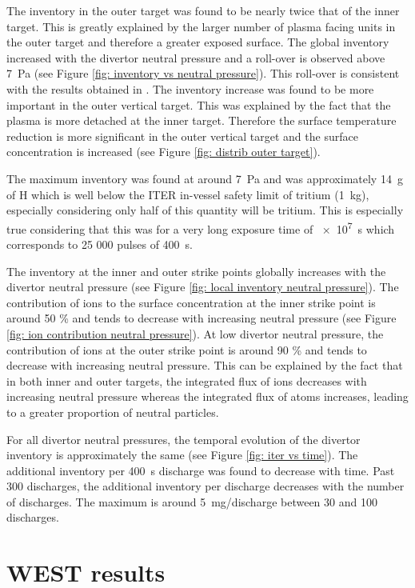 The inventory in the outer target was found to be nearly twice that of the inner target.
This is greatly explained by the larger number of plasma facing units in the outer target and therefore a greater exposed surface.
The global inventory increased with the divertor neutral pressure and a roll-over is observed above \SI{7}{Pa} (see Figure \ref{fig: inventory vs neutral pressure}).
This roll-over is consistent with the results obtained in .
The inventory increase was found to be more important in the outer vertical target.
This was explained by the fact that the plasma is more detached at the inner target.
Therefore the surface temperature reduction is more significant in the outer vertical target and the surface concentration is increased (see Figure \ref{fig: distrib outer target}).

The maximum inventory was found at around \SI{7}{Pa} and was approximately \SI{14}{g} of H which is well below the ITER in-vessel safety limit of tritium (\SI{1}{kg}), especially considering only half of this quantity will be tritium.
This is especially true considering that this was for a very long exposure time of \SI{e7}{s} which corresponds to 25 000 pulses of \SI{400}{s}.


The inventory at the inner and outer strike points globally increases with the divertor neutral pressure (see Figure \ref{fig: local inventory neutral pressure}).
The contribution of ions to the surface concentration at the inner strike point is around 50 \% and tends to decrease with increasing neutral pressure (see Figure \ref{fig: ion contribution neutral pressure}).
At low divertor neutral pressure, the contribution of ions at the outer strike point is around 90 \% and tends to decrease with increasing neutral pressure.
This can be explained by the fact that in both inner and outer targets, the integrated flux of ions decreases with increasing neutral pressure whereas the integrated flux of atoms increases, leading to a greater proportion of neutral particles.

For all divertor neutral pressures, the temporal evolution of the divertor inventory is approximately the same (see Figure \ref{fig: iter vs time}).
The additional inventory per \SI{400}{s} discharge was found to decrease with time.
Past 300 discharges, the additional inventory per discharge decreases with the number of discharges.
The maximum is around \SI{5}{mg/discharge} between 30 and 100 discharges.

\section{WEST results}

